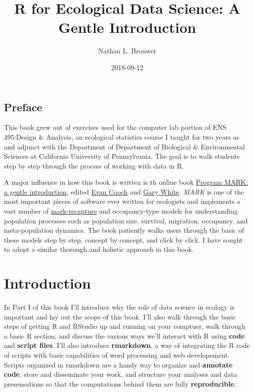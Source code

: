 \documentclass[]{book}
\title{R for Ecological Data Science: A Gentle Introduction}
\author{Nathan L. Brouwer}
\date{2018-09-12}
\theoremstyle{definition}
\theoremstyle{definition}
\theoremstyle{definition}
\theoremstyle{remark}
\begin{document}
\maketitle

{
\setcounter{tocdepth}{1}
\tableofcontents
}
\chapter*{Preface}\label{preface}

This book grew out of exercises used for the computer lab portion of ENS
495:Design \& Analysis, an ecological statistics course I taught for two
years as and adjunct with the Department of Department of Biological \&
Environmental Sciences at California University of Pennsylvania. The
goal is to walk students step by step through the process of working
with data in R.

A major influence in how this book is written is th online book
\href{http://www.phidot.org/software/mark/docs/book/}{Program MARK: a
gentle introduction}, edited \href{http://canuck.dnr.cornell.edu/}{Evan
Cooch} and \href{https://sites.warnercnr.colostate.edu/gwhite/}{Gary
White}. \emph{MARK} is one of the most important pieces of software ever
written for ecologists and implements a vast number of
\href{https://en.wikipedia.org/wiki/Mark_and_recapture}{mark-recapture}
and occupancy-type models for understanding population processes such as
population size, survival, migration, occupancy, and meta-population
dynamics. The book patiently walks users through the basic of these
models step by step, concept by concept, and click by click. I have
sought to adopt a similar thorough and holistic approach in this book.

\part{Introduction}\label{part-introduction}

\subsection*{}\label{section}

In Part I of this book I'll introduce why the role of data science in
ecology is important and lay out the scope of this book. I'll also walk
through the basic steps of getting R and RStudio up and running on your
comptuer, walk through a basic R section, and discuss the various ways
we'll interact with R using \textbf{code} and \textbf{script files}.
I'll also introduce \textbf{rmarkdown}, a way of integrating the R code
of scripts with basic capabilities of word processing and web
developement. Scripts organized in rmarkdown are a handy way to organize
and \textbf{annotate code}, store and disseminate your work, and
structure your analyses and data presensations so that the computations
behind them are fully \textbf{reproducible}.
\end{document}
